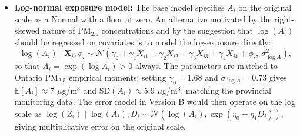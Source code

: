 \documentclass[11pt]{article}
\begin{document}
\begin{itemize}
\item \textbf{Log-normal exposure model:} The base model specifies $A_i$ on the original
scale as a Normal with a floor at zero. An alternative motivated by the right-skewed
nature of PM$_{2.5}$ concentrations and by the suggestion that $\log(A_i)$ should be
regressed on covariates is to model the log-exposure directly:
\begin{equation*}
\log(A_i) \mid \mathbf{X}_i, \phi_i \sim \mathcal{N}\!\left(\gamma_0 + \gamma_1 X_{i1}
+ \gamma_2 X_{i2} + \gamma_3 X_{i3} + \gamma_4 X_{i4} + \phi_i,\
\sigma_{\log A}^2\right),
\end{equation*}
so that $A_i = \exp(\log A_i) > 0$ always. The parameters are matched to Ontario
PM$_{2.5}$ empirical moments: setting $\gamma_0 = 1.68$ and $\sigma_{\log A} = 0.73$
gives $\mathbb{E}[A_i] \approx 7$ $\mu$g/m$^3$ and $\text{SD}(A_i) \approx 5.9$
$\mu$g/m$^3$, matching the provincial monitoring data. The error model in Version B
would then operate on the log scale as $\log(Z_i) \mid \log(A_i), D_i \sim
\mathcal{N}(\log(A_i), \exp(\eta_0 + \eta_1 D_i))$, giving multiplicative error on the
original scale.
\end{itemize}
\end{document}
